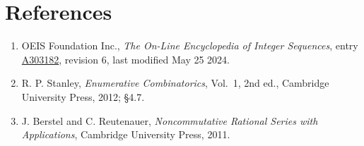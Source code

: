 \documentclass[11pt]{article}
\theoremstyle{definition}
\begin{document}
\section{References}

\begin{enumerate}

\item OEIS Foundation Inc., \emph{The On-Line Encyclopedia of Integer Sequences}, entry \href{https://oeis.org/A303182}{A303182}, revision 6, last modified May 25 2024.

\item R. P. Stanley, \emph{Enumerative Combinatorics}, Vol.~1, 2nd ed., Cambridge University Press, 2012; \S4.7.

\item J. Berstel and C. Reutenauer, \emph{Noncommutative Rational Series with Applications}, Cambridge University Press, 2011.

\end{enumerate}
\end{document}
